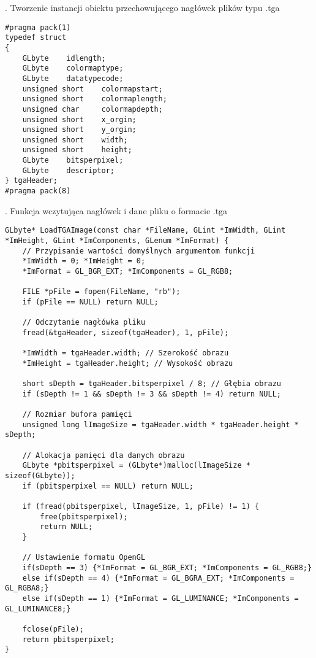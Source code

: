 \documentclass[a4paper,11pt]{article}
\begin{document}
. Tworzenie instancji obiektu przechowującego nagłówek plików typu .tga
\begin{verbatim}
#pragma pack(1)            
typedef struct
{
	GLbyte    idlength;
	GLbyte    colormaptype;
	GLbyte    datatypecode;
	unsigned short    colormapstart;
	unsigned short    colormaplength;
	unsigned char     colormapdepth;
	unsigned short    x_orgin;
	unsigned short    y_orgin;
	unsigned short    width;
	unsigned short    height;
	GLbyte    bitsperpixel;
	GLbyte    descriptor;
} tgaHeader;
#pragma pack(8)
\end{verbatim}
\newpage

. Funkcja wczytująca nagłówek i dane pliku o formacie .tga
\begin{verbatim}
GLbyte* LoadTGAImage(const char *FileName, GLint *ImWidth, GLint *ImHeight, GLint *ImComponents, GLenum *ImFormat) {
	// Przypisanie wartości domyślnych argumentom funkcji
	*ImWidth = 0; *ImHeight = 0;
	*ImFormat = GL_BGR_EXT; *ImComponents = GL_RGB8;

	FILE *pFile = fopen(FileName, "rb");
	if (pFile == NULL) return NULL;
	
	// Odczytanie nagłówka pliku
	fread(&tgaHeader, sizeof(tgaHeader), 1, pFile);
	
	*ImWidth = tgaHeader.width; // Szerokość obrazu
	*ImHeight = tgaHeader.height; // Wysokość obrazu

	short sDepth = tgaHeader.bitsperpixel / 8; // Głębia obrazu	
	if (sDepth != 1 && sDepth != 3 && sDepth != 4) return NULL;
	
	// Rozmiar bufora pamięci
	unsigned long lImageSize = tgaHeader.width * tgaHeader.height * sDepth;

	// Alokacja pamięci dla danych obrazu
	GLbyte *pbitsperpixel = (GLbyte*)malloc(lImageSize * sizeof(GLbyte));
	if (pbitsperpixel == NULL) return NULL;

	if (fread(pbitsperpixel, lImageSize, 1, pFile) != 1) {
		free(pbitsperpixel);
		return NULL;
	}

	// Ustawienie formatu OpenGL
	if(sDepth == 3) {*ImFormat = GL_BGR_EXT; *ImComponents = GL_RGB8;}
	else if(sDepth == 4) {*ImFormat = GL_BGRA_EXT; *ImComponents = GL_RGBA8;}
	else if(sDepth == 1) {*ImFormat = GL_LUMINANCE; *ImComponents = GL_LUMINANCE8;}

	fclose(pFile);
	return pbitsperpixel;
}
\end{verbatim}
\newpage
\end{document}
